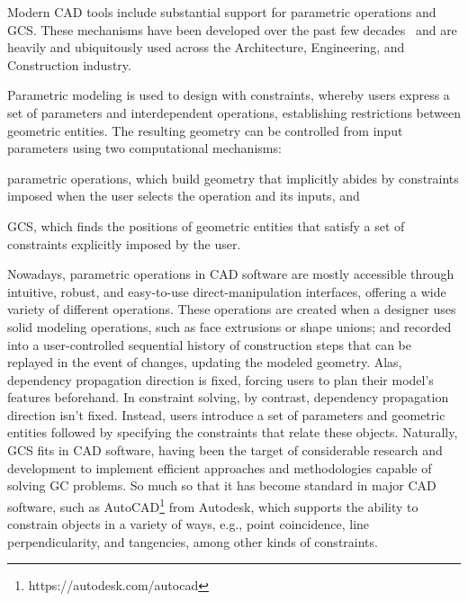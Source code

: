%
\label{chap:intro}
\cleardoublepage{}

\noindent
Modern \ac{CAD} tools include substantial support for parametric operations and
\ac{GCS}.  These mechanisms have been developed over the past few
decades~\cite{Bettig:2011:GCSPC} and are heavily and ubiquitously used across
the Architecture, Engineering, and Construction industry.

Parametric modeling is used to design with constraints, whereby users express a
set of parameters and interdependent operations, establishing restrictions
between geometric entities.  The resulting geometry can be controlled from input
parameters using two computational mechanisms:
\begin{enumerate*}[label= (\arabic*)]
  \item parametric operations, which build geometry that implicitly abides by
  constraints imposed when the user selects the operation and its inputs, and
  \item \ac{GCS}, which finds the positions of geometric entities that satisfy a
  set of constraints explicitly imposed by the user.
\end{enumerate*}

Nowadays, parametric operations in \ac{CAD} software are mostly accessible
through intuitive, robust, and easy-to-use direct-manipulation interfaces,
offering a wide variety of different operations.  These operations are created
when a designer uses solid modeling operations, such as face extrusions or shape
unions; and recorded into a user-controlled sequential history of construction
steps that can be replayed in the event of changes, updating the modeled
geometry.  Alas, dependency propagation direction is fixed, forcing users to
plan their model's features beforehand.  In constraint solving, by contrast,
dependency propagation direction isn't fixed.  Instead, users introduce a set of
parameters and geometric entities followed by specifying the constraints that
relate these objects.  Naturally, \ac{GCS} fits in \ac{CAD} software, having
been the target of considerable research and development to implement efficient
approaches and methodologies capable of solving \ac{GC} problems.  So much so
that it has become standard in major \ac{CAD} software, such as
AutoCAD\footnote{https://autodesk.com/autocad} from
Autodesk\textsuperscript\textregistered, which supports the ability to constrain
objects in a variety of ways, e.g., point coincidence, line perpendicularity,
and tangencies, among other kinds of constraints.

